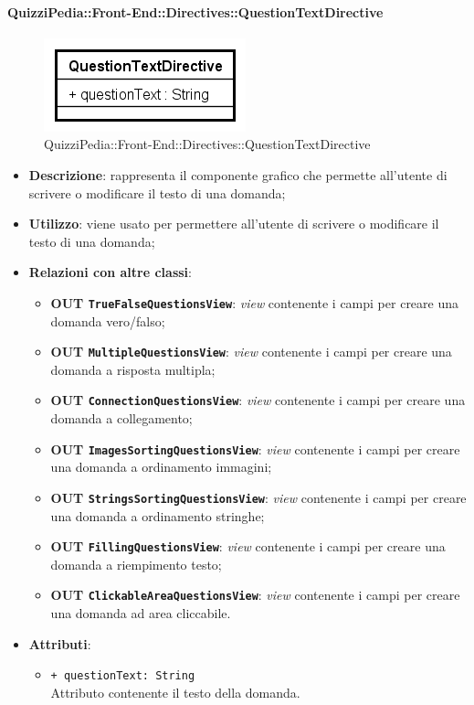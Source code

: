 \paragraph{QuizziPedia::Front-End::Directives::QuestionTextDirective}

\label{QuizziPedia::Front-End::Directives::QuestionTextDirective}

\begin{figure}[ht]
	\centering
	\includegraphics[scale=0.80,keepaspectratio]{UML/Classi/Front-End/QuizziPedia_Front-end_Directives_QuestionTextDirective.png}
	\caption{QuizziPedia::Front-End::Directives::QuestionTextDirective}
\end{figure} 
\FloatBarrier

\begin{itemize}
	\item \textbf{Descrizione}: rappresenta il componente grafico che permette all'utente di scrivere o modificare il testo di una domanda;
	\item \textbf{Utilizzo}: viene usato per permettere all'utente di scrivere o modificare il testo di una domanda;
	\item \textbf{Relazioni con altre classi}: 
	\begin{itemize}
		\item \textbf{OUT \texttt{TrueFalseQuestionsView}}: \textit{view} contenente i campi per creare una domanda vero/falso; 
		\item \textbf{OUT \texttt{MultipleQuestionsView}}: \textit{view} contenente i campi per creare una domanda a risposta multipla;
		\item \textbf{OUT \texttt{ConnectionQuestionsView}}: \textit{view} contenente i campi per creare una domanda a collegamento;
		\item \textbf{OUT \texttt{ImagesSortingQuestionsView}}: \textit{view} contenente i campi per creare una domanda a ordinamento immagini;
		\item \textbf{OUT \texttt{StringsSortingQuestionsView}}: \textit{view} contenente i campi per creare una domanda a ordinamento stringhe;
		\item \textbf{OUT \texttt{FillingQuestionsView}}: \textit{view} contenente i campi per creare una domanda a riempimento testo;
		\item \textbf{OUT \texttt{ClickableAreaQuestionsView}}: \textit{view} contenente i campi per creare una domanda ad area cliccabile.
	\end{itemize}
	\item \textbf{Attributi}: 
	\begin{itemize}
		\item \texttt{+ questionText: String} \\ Attributo contenente il testo della domanda.
	\end{itemize}
\end{itemize}